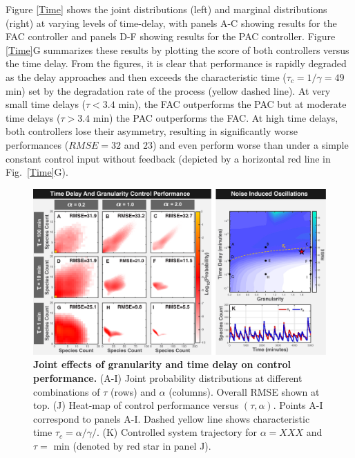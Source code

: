 \documentclass[12pt]{iopart}
\begin{document}
Figure \ref{Time} shows the joint distributions (left) and marginal distributions (right) at varying levels of time-delay, with panels A-C showing results for the FAC controller and panels D-F showing results for the PAC controller. Figure \ref{Time}G summarizes these results by plotting the score of both controllers versus the time delay. From the figures, it is clear that performance is rapidly degraded as the delay approaches and then exceeds the characteristic time ($\tau_c = 1 / \gamma = 49$ min) set by the degradation rate of the process (yellow dashed line). At very small time delays ($\tau< 3.4$ min), the FAC outperforms the PAC  but at moderate time delays ($\tau > 3.4$ min) the PAC outperforms the FAC.
%
At high time delays, both controllers lose their asymmetry, resulting in significantly worse performances ($RMSE = 32$ and $23$) and even perform worse than under a simple constant control input without feedback (depicted by a horizontal red line in Fig.\ \ref{Time}G). 

\begin{figure}
\begin{center}
\includegraphics[width=1\textwidth]{DelayAndGranularity.pdf}
\vspace{-0.1in}
\caption{{\bf Joint effects of granularity and time delay on control performance.} (A-I) Joint probability distributions at different combinations of $\tau$ (rows) and $\alpha$ (columns). Overall RMSE shown at top. (J) Heat-map of control performance versus $(\tau,\alpha)$. Points A-I correspond to panels A-I. Dashed yellow line shows characteristic time $\tau_c = \alpha/\gamma/$.
(K) Controlled system trajectory for $\alpha = XXX$ and $\tau = $ min (denoted by red star in panel J).}
\label{DG}
\end{center}
\vspace{-0.2in}
\end{figure}
\end{document}
